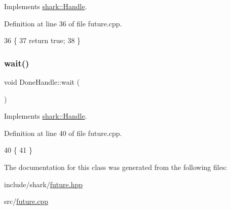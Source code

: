 Implements \hyperlink{classshark_1_1_handle_a79ac46bc643e22c2a1fb28d45634fa68}{shark\+::\+Handle}.



Definition at line 36 of file future.\+cpp.


\begin{DoxyCode}
36                       \{
37     \textcolor{keywordflow}{return} \textcolor{keyword}{true};
38 \}
\end{DoxyCode}
\hypertarget{classshark_1_1_done_handle_a99b4b58b01738073650b9c452e35b7e8}{}\label{classshark_1_1_done_handle_a99b4b58b01738073650b9c452e35b7e8} 
\subsubsection{\texorpdfstring{wait()}{wait()}}
{\footnotesize\ttfamily void Done\+Handle\+::wait (\begin{DoxyParamCaption}{ }\end{DoxyParamCaption})\hspace{0.3cm}{\ttfamily [virtual]}}



Implements \hyperlink{classshark_1_1_handle_a36117a898368730a1619a1a771cca424}{shark\+::\+Handle}.



Definition at line 40 of file future.\+cpp.


\begin{DoxyCode}
40                       \{
41 \}
\end{DoxyCode}


The documentation for this class was generated from the following files\+:\begin{DoxyCompactItemize}
\item 
include/shark/\hyperlink{future_8hpp}{future.\+hpp}\item 
src/\hyperlink{future_8cpp}{future.\+cpp}\end{DoxyCompactItemize}
